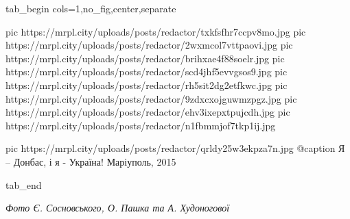  
 
 
 
 

\ifcmt
  tab_begin cols=1,no_fig,center,separate

     pic https://mrpl.city/uploads/posts/redactor/txkfsfhr7ccpv8mo.jpg
		 pic https://mrpl.city/uploads/posts/redactor/2wxmcol7vttpaovi.jpg
		 pic https://mrpl.city/uploads/posts/redactor/brihxae4f88soelr.jpg
		 pic https://mrpl.city/uploads/posts/redactor/scd4jhf5evvgsos9.jpg
		 pic https://mrpl.city/uploads/posts/redactor/rh5sit2dg2etfkwc.jpg
		 pic https://mrpl.city/uploads/posts/redactor/9zdxcxojguwmzpgz.jpg
		 pic https://mrpl.city/uploads/posts/redactor/ehv3ixepxtpujcdh.jpg
		 pic https://mrpl.city/uploads/posts/redactor/n1fbmmjof7tkp1ij.jpg

		 pic https://mrpl.city/uploads/posts/redactor/qrldy25w3ekpza7n.jpg
		 @caption Я – Донбас, і я - Україна! Маріуполь, 2015

  tab_end
\fi

\emph{Фото Є. Сосновського, О. Пашка та А. Худоногової}

